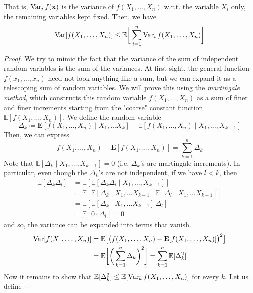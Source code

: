   \begin{theorem}
  That is, $\operatorname{Var}_i f(\mathbf{x})$ is the variance of $f(X_1, \ldots, X_n)$ w.r.t. the variable $X_i$ only, the remaining variables kept fixed. Then, we have 
  \[\operatorname{Var}[f(X_1, \ldots, X_n)] \leq \mathbb{E} \bigg[ \sum_{i=1}^n \operatorname{Var}_i f(X_1, \ldots, X_n) \bigg] \]
  \end{theorem}
  \begin{proof}
  We try to mimic the fact that the variance of the sum of independent random variables is the sum of the variances. At first sight, the general function $f(x_1, \ldots, x_n)$ need not look anything like a sum, but we can expand it as a telescoping sum of random variables. We will prove this using the \textit{martingale method}, which constructs this random variable $f(X_1, \ldots, X_n)$ as a sum of finer and finer increments starting from the "coarse" constant function $\mathbb{E}[f(X_1, \ldots, X_n)]$. We define the random variable 
  \[\Delta_k \coloneqq \mathbf{E}[ f(X_1, \ldots, X_n) \mid X_1, \ldots X_k] - \mathbb{E}[ f(X_1, \ldots, X_n) \mid X_1, \ldots, X_{k-1}]\]
  Then, we can express 
  \[f( X_1, \ldots, X_n) - \mathbf{E}[ f(X_1, \ldots, X_n)] = \sum_{k=1}^n \Delta_k\]
  Note that $\mathbb{E}[\Delta_k \mid X_1, \ldots, X_{k-1}] = 0$ (i.e. $\Delta_k$'s are martingale increments). In particular, even though the $\Delta_k$'s are not independent, if we have $l < k$, then 
  \begin{align*}
      \mathbb{E}[ \Delta_k \Delta_l] & = \mathbb{E}[ \mathbb{E}[\Delta_k \Delta_l \mid X_1, \ldots, X_{k-1}]] \\
      & = \mathbb{E}[ \mathbb{E}[\Delta_k \mid X_1, \ldots X_{k-1} ] \, \mathbb{E}[\Delta_l \mid X_1, \ldots X_{k-1} ]] \\
      & = \mathbb{E}[ \mathbb{E}[\Delta_k \mid X_1, \ldots X_{k-1} ] \, \Delta_l] \\
      & = \mathbb{E}[0 \cdot \Delta_l] = 0
  \end{align*}
  and so, the variance can be expanded into terms that vanish. 
  \begin{align*}
      \operatorname{Var}[ f(X_1, \ldots, X_n)] & = \mathbb{E} \big[ \big( f( X_1, \ldots, X_n) - \mathbf{E}[ f(X_1, \ldots, X_n)] \big)^2\big] \\
      & = \mathbb{E} \bigg[ \bigg( \sum_{k=1}^n \Delta_k \bigg)^2 \bigg] = \sum_{k=1}^n \mathbb{E}[ \Delta_k^2]
  \end{align*}
  Now it remains to show that $\mathbb{E}[\Delta_k^2] \leq \mathbb{E}[\operatorname{Var}_k f(X_1, \ldots, X_n)]$ for every $k$. Let us define 

\end{proof}
